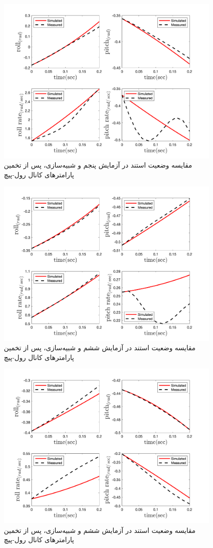 \begin{figure}[H]
	\includegraphics[width=12cm]{../Figures/RCP/roll_pitch_parameter_estimation/RCP_roll_pitch_S5.png}
	\centering
	\caption{مقايسه وضعیت استند در  آزمايش پنجم و شبیه‌سازی، پس از تخمین پارامترهای کانال رول-پیچ}
	\label{roll_pitch_ps5}
\end{figure}
\begin{figure}[H]
	\includegraphics[width=12cm]{../Figures/RCP/roll_pitch_parameter_estimation/RCP_roll_pitch_S6.png}
	\centering
	\caption{مقايسه وضعیت استند در  آزمايش ششم و شبیه‌سازی، پس از تخمین پارامترهای کانال رول-پیچ}
	\label{roll_pitch_ps6}
\end{figure}
\begin{figure}[H]
	\includegraphics[width=12cm]{../Figures/RCP/roll_pitch_parameter_estimation/RCP_roll_pitch_S7.png}
	\centering
	\caption{مقايسه وضعیت استند در  آزمايش ششم و شبیه‌سازی، پس از تخمین پارامترهای کانال رول-پیچ}
	\label{roll_pitch_ps7}
\end{figure}